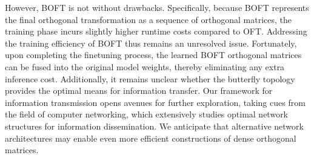 However, BOFT is not without drawbacks. Specifically, because BOFT represents the final orthogonal transformation as a sequence of orthogonal matrices, the training phase incurs slightly higher runtime costs compared to OFT. Addressing the training efficiency of BOFT thus remains an unresolved issue. Fortunately, upon completing the finetuning process, the learned BOFT orthogonal matrices can be fused into the original model weights, thereby eliminating any extra inference cost. Additionally, it remains unclear whether the butterfly topology provides the optimal means for information transfer. Our framework for information transmission opens avenues for further exploration, taking cues from the field of computer networking, which extensively studies optimal network structures for information dissemination. We anticipate that alternative network architectures may enable even more efficient constructions of dense orthogonal matrices.

